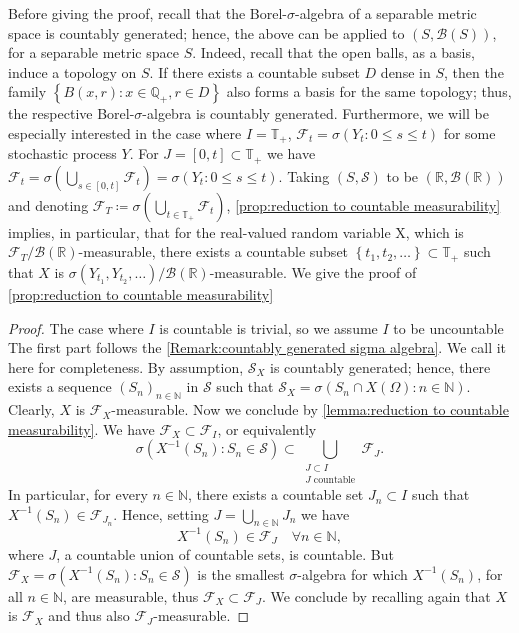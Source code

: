 \documentclass[11pt,a4paper,twoside,openany]{report}
\theoremstyle{plain} %
\theoremstyle{definition} %
\theoremstyle{remark} %
\begin{document}
 Before giving the proof, recall that the Borel-\(\sigma\)-algebra of a separable metric space is countably generated; hence, the above can be applied to \((S,\mathcal{B}(S))\), for a separable metric space \(S\). Indeed, recall that the open balls, as a basis, induce a topology on \(S\). If there exists a countable subset \(D\) dense in \(S\), then the family \(\left\{B(x,r):x\in \mathbb{Q}_+,r\in D\right\}\) also forms a basis for the same topology; thus, the respective Borel-\(\sigma\)-algebra is countably generated. Furthermore, we will be especially interested in the case where \(I=\mathbb{T}_+\), \(\mathcal{F}_t=\sigma(Y_t:0\leq s\leq t)\) for some stochastic process \(Y\). For \(J=[0,t]\subset\mathbb{T}_+\) we have \(\mathcal{F}_t=\sigma(\bigcup_{s\in[0,t]}\mathcal{F}_t)=\sigma(Y_t:0\leq s\leq t)\). Taking \((S,\mathcal{S})\) to be \((\mathbb{R},\mathcal{B}(\mathbb{R}))\) and denoting \(\mathcal{F}_{T}
 \coloneqq \sigma(\bigcup_{t\in\mathbb{T}_+}\mathcal{F}_t)\),  \cref{prop:reduction to countable measurability} implies, in particular, that for the real-valued random variable X, which is \(\mathcal{F}_{T}/\mathcal{B}(\mathbb{R})\)-measurable, there exists a countable subset \(\left\{t_1,t_2,\dots\right\}\subset\mathbb{T}_+\) such that \(X\) is \(\sigma(Y_{t_1},Y_{t_2},\dots)/\mathcal{B}(\mathbb{R})\)-measurable.
 \bigbreak
 We give the proof of \cref{prop:reduction to countable measurability}
 \begin{proof}
 The case where \(I\) is countable is trivial, so we assume \(I\) to be uncountable
 The first part follows the \cref{Remark:countably generated sigma algebra}. We call it here for completeness. By assumption, \(\mathcal{S}_X\) is countably generated; hence, there exists a sequence \((S_n)_{n\in\mathbb{N}}\) in \(\mathcal{S}\) such that \(\mathcal{S}_X=\sigma(S_n\cap X(\Omega):n\in\mathbb{N})\). 
 Clearly, \(X\) is \(\mathcal{F}_X\)-measurable. Now we conclude by \cref{lemma:reduction to countable measurability}. We have \(\mathcal{F}_X\subset\mathcal{F}_I\), or equivalently
 \begin{equation}
     \sigma(X^{-1}(S_n):S_n\in\mathcal{S})\subset\bigcup_{\substack{J\subset I\\ J\text{ countable}}}\mathcal{F}_J.
 \end{equation}
 In particular, for every \(n\in\mathbb{N}\), there exists a countable set \(J_n\subset I\) such that
 \(X^{-1}(S_n)\in \mathcal{F}_{J_n}\). Hence, setting \(J=\bigcup_{n\in\mathbb{N}}J_n\) we have 
 \begin{equation}
     X^{-1}(S_n)\in\mathcal{F}_J\quad\forall n\in\mathbb{N},
 \end{equation}
 where \(J\), a countable union of countable sets, is countable.
 But \(\mathcal{F}_X=\sigma(X^{-1}(S_n):S_n\in\mathcal{S})\) is the smallest \(\sigma\)-algebra for which \(X^{-1}(S_n)\), for all \(n\in\mathbb{N}\), are measurable, thus \(\mathcal{F}_X\subset \mathcal{F}_J\). We conclude by recalling again that \(X\) is \(\mathcal{F}_X\) and thus also \(\mathcal{F}_J\)-measurable.
   \end{proof}
\end{document}
